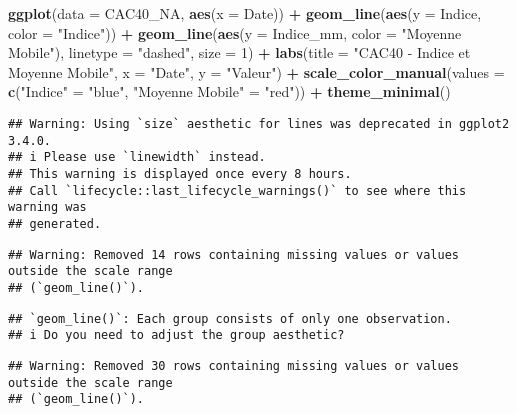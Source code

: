 \documentclass[
]{article}
\newenvironment{Shaded}{\begin{snugshade}}{\end{snugshade}}
\newcommand{\AttributeTok}[1]{\textcolor[rgb]{0.13,0.29,0.53}{#1}}
\newcommand{\DecValTok}[1]{\textcolor[rgb]{0.00,0.00,0.81}{#1}}
\newcommand{\FunctionTok}[1]{\textcolor[rgb]{0.13,0.29,0.53}{\textbf{#1}}}
\newcommand{\NormalTok}[1]{#1}
\newcommand{\OtherTok}[1]{\textcolor[rgb]{0.56,0.35,0.01}{#1}}
\newcommand{\SpecialCharTok}[1]{\textcolor[rgb]{0.81,0.36,0.00}{\textbf{#1}}}
\newcommand{\StringTok}[1]{\textcolor[rgb]{0.31,0.60,0.02}{#1}}
\begin{document}
\begin{Shaded}
\begin{Highlighting}[]
\FunctionTok{ggplot}\NormalTok{(}\AttributeTok{data =}\NormalTok{ CAC40\_NA, }\FunctionTok{aes}\NormalTok{(}\AttributeTok{x =}\NormalTok{ Date)) }\SpecialCharTok{+}
  \FunctionTok{geom\_line}\NormalTok{(}\FunctionTok{aes}\NormalTok{(}\AttributeTok{y =}\NormalTok{ Indice, }\AttributeTok{color =} \StringTok{"Indice"}\NormalTok{)) }\SpecialCharTok{+}
  \FunctionTok{geom\_line}\NormalTok{(}\FunctionTok{aes}\NormalTok{(}\AttributeTok{y =}\NormalTok{ Indice\_mm, }\AttributeTok{color =} \StringTok{"Moyenne Mobile"}\NormalTok{), }\AttributeTok{linetype =} \StringTok{"dashed"}\NormalTok{, }\AttributeTok{size =} \DecValTok{1}\NormalTok{) }\SpecialCharTok{+}
  \FunctionTok{labs}\NormalTok{(}\AttributeTok{title =} \StringTok{"CAC40 {-} Indice et Moyenne Mobile"}\NormalTok{,}
       \AttributeTok{x =} \StringTok{"Date"}\NormalTok{,}
       \AttributeTok{y =} \StringTok{"Valeur"}\NormalTok{) }\SpecialCharTok{+}
  \FunctionTok{scale\_color\_manual}\NormalTok{(}\AttributeTok{values =} \FunctionTok{c}\NormalTok{(}\StringTok{"Indice"} \OtherTok{=} \StringTok{"blue"}\NormalTok{, }\StringTok{"Moyenne Mobile"} \OtherTok{=} \StringTok{"red"}\NormalTok{)) }\SpecialCharTok{+}
  \FunctionTok{theme\_minimal}\NormalTok{()}
\end{Highlighting}
\end{Shaded}

\begin{verbatim}
## Warning: Using `size` aesthetic for lines was deprecated in ggplot2 3.4.0.
## i Please use `linewidth` instead.
## This warning is displayed once every 8 hours.
## Call `lifecycle::last_lifecycle_warnings()` to see where this warning was
## generated.
\end{verbatim}

\begin{verbatim}
## Warning: Removed 14 rows containing missing values or values outside the scale range
## (`geom_line()`).
\end{verbatim}

\begin{verbatim}
## `geom_line()`: Each group consists of only one observation.
## i Do you need to adjust the group aesthetic?
\end{verbatim}

\begin{verbatim}
## Warning: Removed 30 rows containing missing values or values outside the scale range
## (`geom_line()`).
\end{verbatim}
\end{document}
